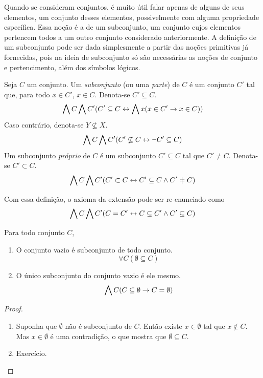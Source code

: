 Quando se consideram conjuntos, é muito útil falar apenas de alguns de seus elementos, um conjunto desses elementos, possivelmente com alguma propriedade específica. Essa noção é a de um subconjunto, um conjunto cujos elementos pertencem todos a um outro conjunto considerado anteriormente. A definição de um subconjunto pode ser dada simplesmente a partir das noções primitivas já fornecidas, pois na ideia de subconjunto só são necessárias as noções de conjunto e pertencimento, além dos símbolos lógicos.

\begin{definition}
Seja $C$ um conjunto. Um \emph{subconjunto} (ou uma \emph{parte}) de $C$ é um conjunto $C'$ tal que, para todo $x \in C'$, $x \in C$. Denota-se $C' \subseteq C$.
	\begin{equation*}
	\bigwedge\nolimits C \bigwedge\nolimits C' (C' \subseteq C \leftrightarrow \bigwedge\nolimits x (x \in C' \rightarrow x \in C))
	\end{equation*}
Caso contrário, denota-se $Y \nsubseteq X$.
	\begin{equation*}
	\bigwedge\nolimits C \bigwedge\nolimits C' (C' \nsubseteq C \leftrightarrow \lnot C' \subseteq C)
	\end{equation*}
Um subconjunto \emph{próprio} de $C$ é um subconjunto $C' \subseteq C$ tal que $C' \neq C$. Denota-se $C' \subset C$.
	\begin{equation*}
	\forall C \forall C' (C' \subset C \lequiv C' \subseteq C \lee C' \neq C)
	\end{equation*}
\end{definition}

Com essa definição, o axioma da extensão pode ser re-enunciado como
	\begin{equation*}
	\bigwedge\nolimits C \bigwedge\nolimits C' (C = C' \leftrightarrow C \subseteq C' \land C' \subseteq C)
	\end{equation*}

\begin{proposition}
Para todo conjunto $C$,
	\begin{enumerate}
	\item O conjunto vazio é subconjunto de todo conjunto.
		\begin{equation*}
		\forall C(\emptyset \subseteq C)
		\end{equation*}
	\item O único subconjunto do conjunto vazio é ele mesmo.
		\begin{equation*}
		\bigwedge\nolimits C(C \subseteq \emptyset \rightarrow C = \emptyset)
		\end{equation*}
	\end{enumerate}
\end{proposition}
\begin{proof}
	\begin{enumerate}
	\item Suponha que $\emptyset$ não é subconjunto de $C$. Então existe $x \in \emptyset$ tal que $x \notin C$. Mas $x \in \emptyset$ é uma contradição, o que mostra que $\emptyset \subseteq C$.
	
	\item Exercício.
	\end{enumerate}
\end{proof}

